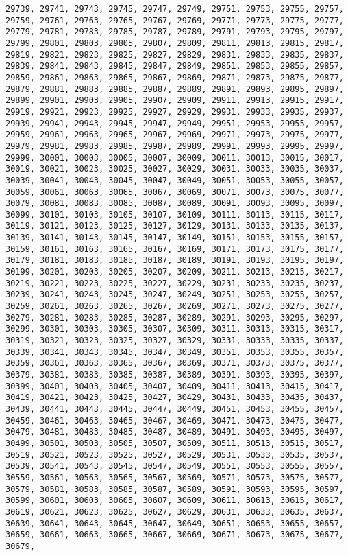 \documentclass[11pt]{article}
\begin{document}
\begin{Verbatim}[commandchars=\\\{\}]
29739, 29741, 29743, 29745, 29747, 29749, 29751, 29753, 29755, 29757, 29759, 29761, 29763, 29765, 29767, 29769, 29771, 29773, 29775, 29777, 29779, 29781, 29783, 29785, 29787, 29789, 29791, 29793, 29795, 29797, 29799, 29801, 29803, 29805, 29807, 29809, 29811, 29813, 29815, 29817, 29819, 29821, 29823, 29825, 29827, 29829, 29831, 29833, 29835, 29837, 29839, 29841, 29843, 29845, 29847, 29849, 29851, 29853, 29855, 29857, 29859, 29861, 29863, 29865, 29867, 29869, 29871, 29873, 29875, 29877, 29879, 29881, 29883, 29885, 29887, 29889, 29891, 29893, 29895, 29897, 29899, 29901, 29903, 29905, 29907, 29909, 29911, 29913, 29915, 29917, 29919, 29921, 29923, 29925, 29927, 29929, 29931, 29933, 29935, 29937, 29939, 29941, 29943, 29945, 29947, 29949, 29951, 29953, 29955, 29957, 29959, 29961, 29963, 29965, 29967, 29969, 29971, 29973, 29975, 29977, 29979, 29981, 29983, 29985, 29987, 29989, 29991, 29993, 29995, 29997, 29999, 30001, 30003, 30005, 30007, 30009, 30011, 30013, 30015, 30017, 30019, 30021, 30023, 30025, 30027, 30029, 30031, 30033, 30035, 30037, 30039, 30041, 30043, 30045, 30047, 30049, 30051, 30053, 30055, 30057, 30059, 30061, 30063, 30065, 30067, 30069, 30071, 30073, 30075, 30077, 30079, 30081, 30083, 30085, 30087, 30089, 30091, 30093, 30095, 30097, 30099, 30101, 30103, 30105, 30107, 30109, 30111, 30113, 30115, 30117, 30119, 30121, 30123, 30125, 30127, 30129, 30131, 30133, 30135, 30137, 30139, 30141, 30143, 30145, 30147, 30149, 30151, 30153, 30155, 30157, 30159, 30161, 30163, 30165, 30167, 30169, 30171, 30173, 30175, 30177, 30179, 30181, 30183, 30185, 30187, 30189, 30191, 30193, 30195, 30197, 30199, 30201, 30203, 30205, 30207, 30209, 30211, 30213, 30215, 30217, 30219, 30221, 30223, 30225, 30227, 30229, 30231, 30233, 30235, 30237, 30239, 30241, 30243, 30245, 30247, 30249, 30251, 30253, 30255, 30257, 30259, 30261, 30263, 30265, 30267, 30269, 30271, 30273, 30275, 30277, 30279, 30281, 30283, 30285, 30287, 30289, 30291, 30293, 30295, 30297, 30299, 30301, 30303, 30305, 30307, 30309, 30311, 30313, 30315, 30317, 30319, 30321, 30323, 30325, 30327, 30329, 30331, 30333, 30335, 30337, 30339, 30341, 30343, 30345, 30347, 30349, 30351, 30353, 30355, 30357, 30359, 30361, 30363, 30365, 30367, 30369, 30371, 30373, 30375, 30377, 30379, 30381, 30383, 30385, 30387, 30389, 30391, 30393, 30395, 30397, 30399, 30401, 30403, 30405, 30407, 30409, 30411, 30413, 30415, 30417, 30419, 30421, 30423, 30425, 30427, 30429, 30431, 30433, 30435, 30437, 30439, 30441, 30443, 30445, 30447, 30449, 30451, 30453, 30455, 30457, 30459, 30461, 30463, 30465, 30467, 30469, 30471, 30473, 30475, 30477, 30479, 30481, 30483, 30485, 30487, 30489, 30491, 30493, 30495, 30497, 30499, 30501, 30503, 30505, 30507, 30509, 30511, 30513, 30515, 30517, 30519, 30521, 30523, 30525, 30527, 30529, 30531, 30533, 30535, 30537, 30539, 30541, 30543, 30545, 30547, 30549, 30551, 30553, 30555, 30557, 30559, 30561, 30563, 30565, 30567, 30569, 30571, 30573, 30575, 30577, 30579, 30581, 30583, 30585, 30587, 30589, 30591, 30593, 30595, 30597, 30599, 30601, 30603, 30605, 30607, 30609, 30611, 30613, 30615, 30617, 30619, 30621, 30623, 30625, 30627, 30629, 30631, 30633, 30635, 30637, 30639, 30641, 30643, 30645, 30647, 30649, 30651, 30653, 30655, 30657, 30659, 30661, 30663, 30665, 30667, 30669, 30671, 30673, 30675, 30677, 30679, 
\end{Verbatim}
\end{document}
